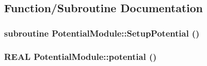 \subsection{Function/Subroutine Documentation}
\hypertarget{namespace_potential_module_a0c5361b39413bf95854a08097d55a022}{
\subsubsection[{SetupPotential}]{\setlength{\rightskip}{0pt plus 5cm}subroutine PotentialModule::SetupPotential ()}}
\label{namespace_potential_module_a0c5361b39413bf95854a08097d55a022}
\hypertarget{namespace_potential_module_afce25724f08bbb54ef8f643edb2650e2}{
\subsubsection[{potential}]{\setlength{\rightskip}{0pt plus 5cm}REAL PotentialModule::potential ()}}
\label{namespace_potential_module_afce25724f08bbb54ef8f643edb2650e2}


